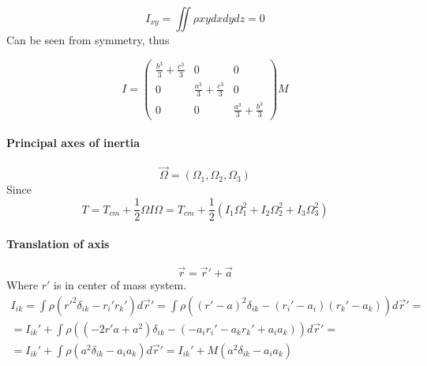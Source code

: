 $$I_{xy} = \iint \rho xy dxdydz = 0$$
Can be seen from symmetry, thus

$$I = \begin{pmatrix}
\frac{b^3}{3}+\frac{c^3}{3}&0&0\\
0&\frac{a^3}{3}+\frac{c^3}{3}&0\\
0&0&\frac{a^3}{3}+\frac{b^3}{3}
\end{pmatrix}M$$
\paragraph{Principal axes of inertia}
$$\vec{\Omega} = (\Omega_1, \Omega_2, \Omega_3)$$
Since
$$T  = T_{cm} + \frac{1}{2} \Omega I \Omega = T_{cm} + \frac{1}{2 } \left( I_1\Omega_1^2+ I_2\Omega_2^2+ I_3\Omega_3^2 \right)$$

\paragraph{Translation of axis}
$$\vec{r} = \vec{r}' + \vec{a}$$
Where $r'$ is in center of mass system.
\begin{align*}
I_{ik} = \int \rho \left({r'}^2 \delta_{ik} -r_i'r_k' \right) d\vec{r}' = \int \rho \left({\left(r'-a\right)}^2 \delta_{ik} -(r_i'-a_i)(r_k'-a_k) \right) d\vec{r}' =\\= I_{ik}' + \int \rho \left(\left(-2r'a + a^2\right) \delta_{ik} -(-a_ir_i'-a_kr_k'+a_ia_k) \right) d\vec{r}' =\\= I_{ik}' + \int \rho \left( a^2 \delta_{ik} - a_ia_k \right) d\vec{r}' = I_{ik}' + M \left( a^2 \delta_{ik} - a_ia_k \right) 
\end{align*}

